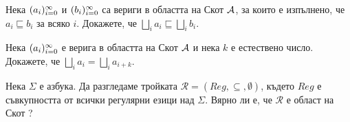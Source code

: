 \begin{problem}
  Нека $(a_{i})^{\infty}_{i=0}$ и $(b_{i})^{\infty}_{i=0}$ са вериги в областта на Скот $\mathcal{A}$, за които е изпълнено, че
  $a_i \sqsubseteq b_i$ за всяко $i$.
  Докажете, че $\bigsqcup_i a_i \sqsubseteq \bigsqcup_i b_i$.
\end{problem}

\begin{problem}
  Нека $(a_{i})^{\infty}_{i=0}$ е верига в областта на Скот $\mathcal{A}$ и нека $k$ е естествено число.
  Докажете, че $\bigsqcup_i a_i = \bigsqcup_i a_{i+k}$.
\end{problem}

\begin{problem}
  Нека $\Sigma$ е азбука. Да разгледаме тройката $\mathcal{R} = (Reg, \subseteq, \emptyset)$, където $Reg$ е съвкупността от всички регулярни езици над $\Sigma$.
  Вярно ли е, че $\mathcal{R}$ е област на Скот ?
\end{problem}



